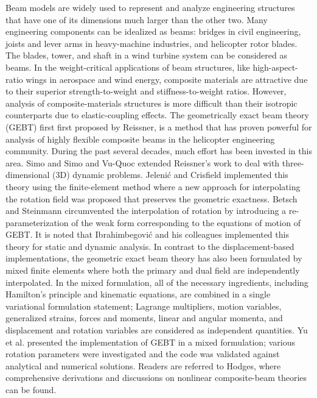 Beam models are widely used to represent and analyze engineering structures
that have one of its dimensions much larger than the other two. Many
engineering components can be idealized as beams: bridges in civil
engineering, joists and lever arms in heavy-machine industries, and
helicopter rotor blades. The blades, tower, and shaft in a wind turbine
system can be considered as beams. In the weight-critical applications of
beam structures, like high-aspect-ratio wings in aerospace and wind energy,
composite materials are attractive due to their superior strength-to-weight
and stiffness-to-weight ratios.  However, analysis of composite-materials
structures is more difficult than their isotropic counterparts due to
elastic-coupling effects. The geometrically exact beam theory (GEBT) first
first proposed by Reissner\cite{Ressiner1973}, is a method that
has proven powerful for analysis of highly flexible composite beams in the
helicopter engineering community. During the past several decades, much
effort has been invested in this area. Simo\cite{Simo1985} and Simo and
Vu-Quoc\cite{Simo1986} extended Reissner's work to deal with
three-dimensional (3D) dynamic problems. Jeleni\'c and
Crisfield\cite{Crisfield1999} implemented this theory using the finite-element method where a new approach for interpolating the rotation field was
proposed that preserves the geometric exactness. Betsch and
Steinmann\cite{Betsch2002} circumvented the interpolation of rotation by
introducing a re-parameterization of the weak form corresponding to the
equations of motion of GEBT. It is noted that Ibrahimbegovi\'c and his
colleagues implemented this theory for static\cite{Ibrahim1995} and
dynamic\cite{Ibrahim1998} analysis. In contrast to the displacement-based
implementations, the geometric exact beam theory has also been formulated by
mixed finite elements where both the primary and dual field are
independently interpolated\cite{CookFEM}. In the mixed formulation, all of
the necessary ingredients, including Hamilton's principle and kinematic
equations, are combined in a single variational formulation statement;
Lagrange multipliers, motion variables, generalized strains, forces and
moments, linear and angular momenta, and displacement and rotation variables
are considered as independent quantities. Yu et al.\cite{YuGEBT,
Wang:GEBT2013} presented the implementation of GEBT in a mixed formulation;
various rotation parameters were investigated and the code was validated
against analytical and numerical solutions. Readers are referred to
Hodges\cite{HodgesBeamBook}, where comprehensive derivations and
discussions on nonlinear composite-beam theories can be found.

